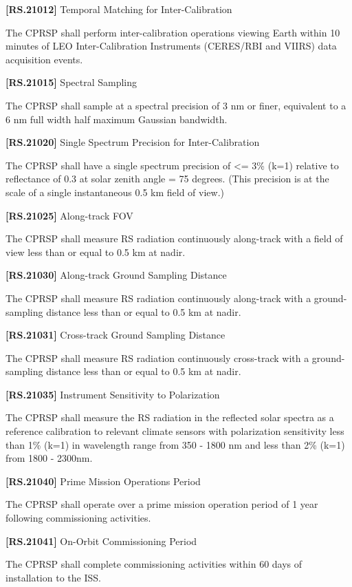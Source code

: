 \documentclass[12pt,oneside,oldfontcommands]{memoir}
\begin{document}
\textbf{[RS.21012]} Temporal Matching for Inter-Calibration

The \gls{CPRSP} shall perform inter-calibration operations viewing Earth within 10 minutes of \gls{LEO} Inter-Calibration Instruments (CERES\slash RBI and VIIRS) data acquisition events.

\textbf{[RS.21015]} Spectral Sampling

The \gls{CPRSP} shall \gls{sample} at a spectral precision of 3 nm or finer, equivalent to a 6 nm full width half maximum Gaussian bandwidth.

\textbf{[RS.21020]} Single Spectrum Precision for Inter-Calibration

The \gls{CPRSP} shall have a single spectrum precision of <= 3\% (k=1) relative to reflectance of 0.3 at solar zenith angle = 75 degrees. (This precision is at the scale of a single instantaneous 0.5 km field of view.)

\textbf{[RS.21025]} Along-track \gls{FOV}

The \gls{CPRSP} shall \gls{measure} \gls{RS} radiation continuously along-track with a field of view less than or equal to 0.5 km at nadir.

\textbf{[RS.21030]} Along-track Ground Sampling Distance

The \gls{CPRSP} shall \gls{measure} \gls{RS} radiation continuously along-track with a ground-sampling distance less than or equal to 0.5 km at nadir.

\textbf{[RS.21031]} Cross-track Ground Sampling Distance

The \gls{CPRSP} shall \gls{measure} \gls{RS} radiation continuously cross-track with a ground-sampling distance less than or equal to 0.5 km at nadir.

\textbf{[RS.21035]} Instrument Sensitivity to Polarization

The \gls{CPRSP} shall \gls{measure} the \gls{RS} radiation in the reflected solar spectra as a reference calibration to relevant climate sensors with polarization sensitivity less than 1\% (k=1) in wavelength range from 350 - 1800 nm and less than 2\% (k=1) from 1800 - 2300nm.

\textbf{[RS.21040]} Prime Mission Operations Period

The \gls{CPRSP} shall operate over a prime mission operation period of 1 year following commissioning activities.

\textbf{[RS.21041]} On-Orbit Commissioning Period

The \gls{CPRSP} shall complete commissioning activities within 60 days of installation to the \gls{ISS}.
\end{document}

